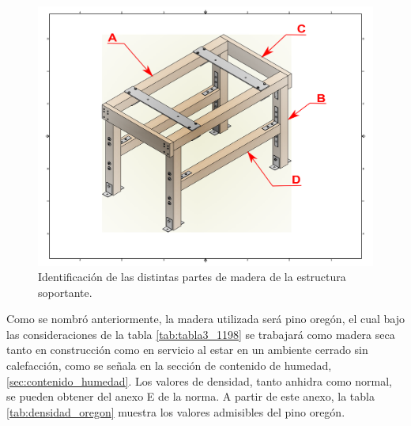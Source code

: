 \begin{figure}[h]
\centering
\includegraphics[width=1\linewidth, trim={10cm 5cm 7cm 3cm},clip]{Imagenes/mesa_iso.png}
\caption{Identificación de las distintas partes de madera de la estructura soportante.}
\label{fig:mesa_iso}
\end{figure}

Como se nombró anteriormente, la madera utilizada será pino oregón, el cual bajo las consideraciones de la tabla \ref{tab:tabla3_1198} se trabajará como madera seca tanto en construcción como en servicio al estar en un ambiente cerrado sin calefacción, como se señala en la sección de contenido de humedad, \ref{sec:contenido_humedad}. Los valores de densidad, tanto anhidra como normal, se pueden obtener del anexo E de la norma. A partir de este anexo, la tabla \ref{tab:densidad_oregon} muestra los valores admisibles del pino oregón.

